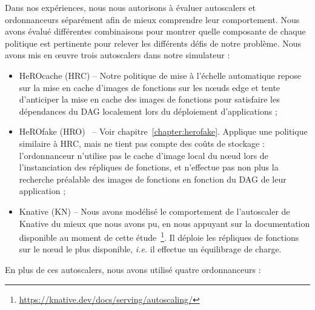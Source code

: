 {Dans nos expériences, nous nous autorisons à évaluer autoscalers et ordonnanceurs séparément afin de mieux comprendre leur comportement. Nous avons évalué différentes combinaisons pour montrer quelle composante de chaque politique est pertinente pour relever les différents défis de notre problème. Nous avons mis en œuvre trois autoscalers dans notre simulateur :

\begin{itemize}
    \item HeROcache (HRC) -- Notre politique de mise à l'échelle automatique repose sur la mise en cache d'images de fonctions sur les nœuds edge et tente d'anticiper la mise en cache des images de fonctions pour satisfaire les dépendances du DAG localement lors du déploiement d'applications ;
    \item HeROfake (HRO)~\cite{herofake} -- Voir chapitre~\ref{chapter:herofake}. Applique une politique similaire à HRC, mais ne tient pas compte des coûts de stockage : l'ordonnanceur n'utilise pas le cache d'image local du nœud lors de l'instanciation des répliques de fonctions, et n'effectue pas non plus la recherche préalable des images de fonctions en fonction du DAG de leur application ;
    \item Knative (KN) -- Nous avons modélisé le comportement de l'autoscaler de Knative du mieux que nous avons pu, en nous appuyant sur la documentation disponible au moment de cette étude~\footnote{\href{https://knative.dev/docs/serving/autoscaling/}{https://knative.dev/docs/serving/autoscaling/}}. Il déploie les répliques de fonctions sur le nœud le plus disponible, \textit{i.e.} il effectue un équilibrage de charge.
\end{itemize}

En plus de ces autoscalers, nous avons utilisé quatre ordonnanceurs :

}
